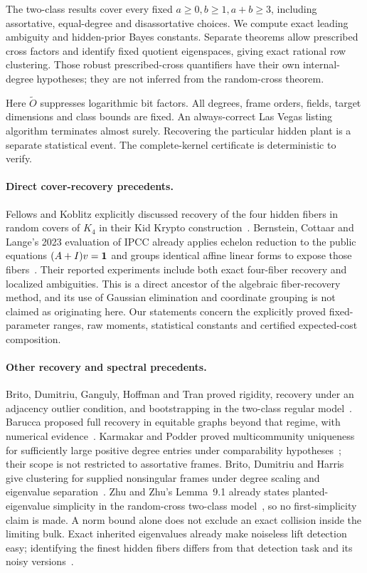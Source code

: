 The two-class results cover every fixed $a\ge0,b\ge1,a+b\ge3$,
including assortative, equal-degree and disassortative choices.
We compute exact leading ambiguity and hidden-prior Bayes constants.
Separate theorems allow prescribed cross factors and identify fixed
quotient eigenspaces, giving exact rational row clustering. Those
robust prescribed-cross quantifiers have their own internal-degree
hypotheses; they are not inferred from the random-cross theorem.

Here $\widetilde O$ suppresses logarithmic bit factors. All degrees,
frame orders, fields, target dimensions and class bounds are fixed.
An always-correct Las Vegas listing algorithm terminates almost surely.
Recovering the particular hidden plant is a separate statistical event.
The complete-kernel certificate is deterministic to verify.

\paragraph{Direct cover-recovery precedents.}
Fellows and Koblitz explicitly discussed recovery of the four hidden
fibers in random covers of $K_4$ in their Kid Krypto
construction~\cite{KidKrypto}. Bernstein, Cottaar and Lange's
2023 evaluation of IPCC already applies echelon reduction to the
public equations $(A+I)v=\mathbf 1$ and groups identical affine linear
forms to expose those fibers~\cite{BCL}. Their reported experiments
include both exact four-fiber recovery and localized ambiguities.
This is a direct ancestor of the algebraic fiber-recovery method,
and its use of Gaussian elimination and coordinate grouping is not
claimed as originating here. Our statements concern the explicitly
proved fixed-parameter ranges, raw moments, statistical constants
and certified expected-cost composition.

\paragraph{Other recovery and spectral precedents.}
Brito, Dumitriu, Ganguly, Hoffman and Tran proved rigidity, recovery
under an adjacency outlier condition, and bootstrapping in the
two-class regular model~\cite{BDGHT}. Barucca proposed full recovery
in equitable graphs beyond that regime, with numerical
evidence~\cite{Barucca}. Karmakar and Podder proved multicommunity
uniqueness for sufficiently large positive degree entries under
comparability hypotheses~\cite{KP}; their scope is not restricted
to assortative frames. Brito, Dumitriu and Harris give clustering
for supplied nonsingular frames under degree scaling and eigenvalue
separation~\cite{BDH}. Zhu and Zhu's Lemma~9.1 already states
planted-eigenvalue simplicity in the random-cross two-class
model~\cite{ZZ}, so no first-simplicity claim is made.
A norm bound alone does not exclude an exact collision inside the
limiting bulk. Exact inherited eigenvalues already make noiseless
lift detection easy; identifying the finest hidden fibers differs
from that detection task and its noisy versions~\cite{KY}.

